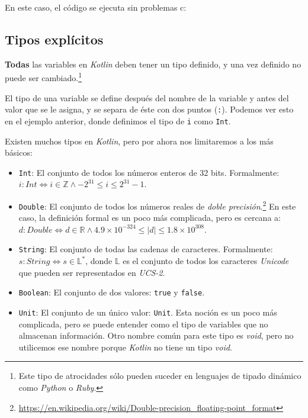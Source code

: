   En este caso, el código se ejecuta sin problemas c:

  \subsection{Tipos explícitos}
    \textbf{Todas} las variables en \textit{Kotlin} deben tener un tipo 
    definido, y una vez definido no puede ser cambiado.\footnote{
      Este tipo de atrocidades sólo pueden suceder en lenguajes de tipado dinámico como 
      \textit{Python} o \textit{Ruby}.
    }
    
    El tipo de una variable se define después del nombre de la variable y antes del valor que se le
    asigna, y se separa de éste con dos puntos (\texttt{:}).
    Podemos ver esto en el ejemplo anterior, donde definimos el tipo de \texttt{i} como 
    \texttt{Int}.

    Existen muchos tipos en \textit{Kotlin}, pero por ahora nos limitaremos a los más básicos:
    
    \begin{itemize}
      \item \texttt{Int}: El conjunto de todos los números enteros de 32 bits. 
        Formalmente: \(i: Int \iff i \in \mathbb{Z} \land -2^{31} \leq i \leq 2^{31} - 1\).
      \item \texttt{Double}: El conjunto de todos los números reales de \textit{doble 
        precisión}.\footnote{\url{https://en.wikipedia.org/wiki/Double-precision_floating-point_format}}
        En este caso, la definición formal es un poco más complicada, pero es cercana a:
        \(d: Double \iff d \in \mathbb{R} \land 4.9 \times 10^{-324} \leq |d| \leq 1.8 \times 10^{308}\).
      \item \texttt{String}: El conjunto de todas las cadenas de caracteres.
        Formalmente: \(s: String \iff s \in \mathbb{L}^*\), donde \(\mathbb{L}\) es el conjunto de
        todos los caracteres \textit{Unicode} que pueden ser representados en \textit{UCS-2}.
      \item \texttt{Boolean}: El conjunto de dos valores: \texttt{true} y \texttt{false}.
      \item \texttt{Unit}: El conjunto de un único valor: \texttt{Unit}.
        Esta noción es un poco más complicada, pero se puede entender como el tipo de variables que
        no almacenan información.
        Otro nombre común para este tipo es \textit{void}, pero no utilicemos ese nombre porque
        \textit{Kotlin} no tiene un tipo \textit{void}.
    \end{itemize}

